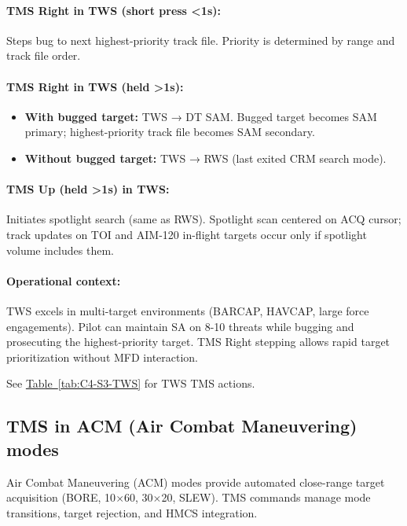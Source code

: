 \documentclass[11pt, a4paper, twoside]{report}
\newcommand{\tabref}[1]{\hyperref[#1]{Table~\ref*{#1}}}
\begin{document}
\paragraph{TMS Right in TWS (short press <1s):}
Steps bug to next highest-priority track file. Priority is determined by range and track file order.

\paragraph{TMS Right in TWS (held >1s):}
\begin{itemize}
    \item \textbf{With bugged target:} TWS → DT SAM. Bugged target becomes SAM primary; highest-priority track file becomes SAM secondary.
    \item \textbf{Without bugged target:} TWS → RWS (last exited CRM search mode).
\end{itemize}

\paragraph{TMS Up (held >1s) in TWS:}
Initiates spotlight search (same as RWS). Spotlight scan centered on ACQ cursor; track updates on TOI and AIM-120 in-flight targets occur only if spotlight volume includes them.

\paragraph{Operational context:}
TWS excels in multi-target environments (BARCAP, HAVCAP, large force engagements). Pilot can maintain SA on 8-10 threats while bugging and prosecuting the highest-priority target. TMS Right stepping allows rapid target prioritization without MFD interaction.

See \tabref{tab:C4-S3-TWS} for TWS TMS actions.

\subsection{TMS in ACM (Air Combat Maneuvering) modes}
\label{sec:C4-S3-S4}

Air Combat Maneuvering (ACM) modes provide automated close-range target 
acquisition (BORE, 10$\times$60, 30$\times$20, SLEW). TMS commands manage 
mode transitions, target rejection, and HMCS integration.
\end{document}
